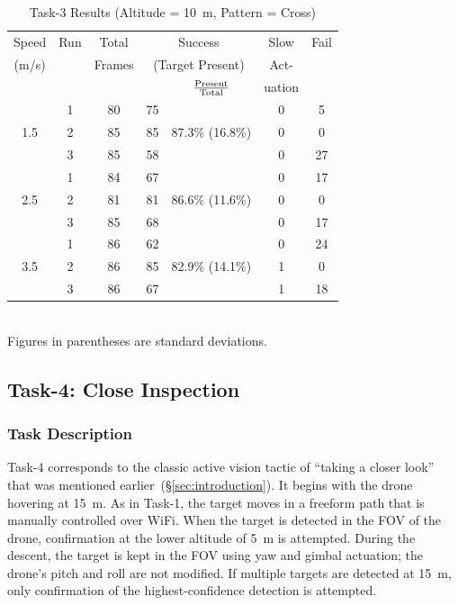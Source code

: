 \begin{table}
	\centering\small
	\begin{tabular}{|c|c|c|c|c|c|c|}
		\hline
		Speed & Run & Total & \multicolumn{2}{c|}{Success} & Slow & Fail\\
		(m/s) &  & Frames  & \multicolumn{2}{c|}{\footnotesize (Target Present)}& Act-  &  \\
		\cline{5-5} 
		&  &         &         & $\rm \frac{Present}{Total}$ & uation  & \\ 
		\hline
		& 1 & 80 & 75 &    & 0 & 5 \\
		1.5 & 2 & 85 & 85 & 87.3\% \scriptsize{(16.8\%)} & 0 & 0 \\
		& 3 & 85 & 58 &    & 0 & 27 \\
		\hline
		& 1 & 84 & 67 &        & 0 & 17 \\
		2.5 & 2 & 81 & 81 & 86.6\% \scriptsize{(11.6\%)} & 0 &  0 \\
		& 3 & 85 & 68 &        & 0 &  17 \\
		\hline
		& 1 & 86 & 62 &        & 0 &  24 \\
		3.5 & 2 & 86 & 85 & 82.9\% \scriptsize{(14.1\%)} & 1 & 0 \\
		& 3 & 86 & 67 &        & 1 &  18 \\
		\hline
	\end{tabular}
	\begin{captext}
		\centering \\[0.1cm] Figures in parentheses are standard deviations. \\
	\end{captext}
	\caption{Task-3 Results {\footnotesize (Altitude = 10~m, Pattern = Cross)}}
	\label{tab:task3-results-10m-cross}
\end{table}

\subsection{Task-4: Close Inspection}
\label{sec:task4}

\subsubsection{Task Description}
\label{sec:task4-desc}

Task-4 corresponds to the classic active vision tactic of ``taking a
closer look'' that was mentioned earlier~(\S\ref{sec:introduction}).   It
begins with the drone hovering at 15~m.  As in Task-1, the target
moves in a freeform path that is manually controlled over WiFi.  When
the target is detected in the FOV of the drone, confirmation at the
lower altitude of 5~m is attempted.  During the descent, the target is
kept in the FOV using yaw and gimbal actuation; the drone's
pitch and roll are not modified.  If multiple targets are detected at
15~m, only confirmation of the highest-confidence detection is
attempted.




